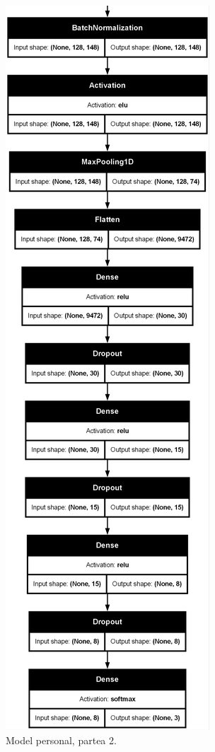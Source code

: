 \begin{figure}
    \centering
    \includegraphics[width=0.4\linewidth]{model_part2.png}
    \caption{Model personal, partea 2.}
    \label{fig:model_part2}
\end{figure}


